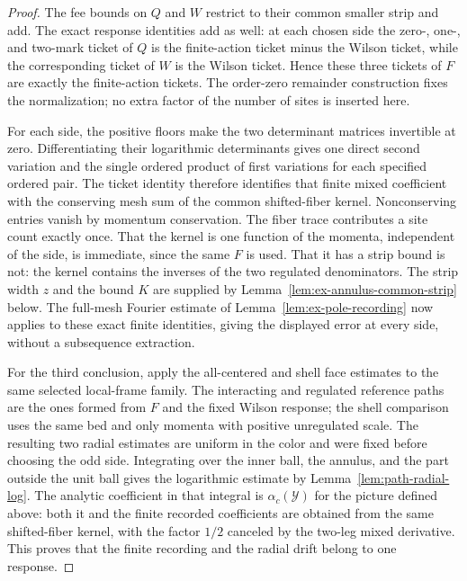 \begin{proof}
The fee bounds on $Q$ and $W$ restrict to their common smaller strip and add.
The exact response identities add as well: at each chosen side the zero-,
one-, and two-mark ticket of $Q$ is the finite-action ticket minus the
Wilson ticket, while the corresponding ticket of $W$ is the Wilson ticket.
Hence these three tickets of $F$ are exactly the finite-action tickets.
The order-zero remainder construction fixes the normalization; no extra
factor of the number of sites is inserted here.

For each side, the positive floors make the two determinant matrices
invertible at zero. Differentiating their logarithmic determinants gives
one direct second variation and the single ordered product of first
variations for each specified ordered pair. The ticket identity therefore
identifies that finite mixed coefficient with the conserving mesh sum of
the common shifted-fiber kernel. Nonconserving entries vanish by momentum
conservation. The fiber trace contributes a site count exactly once.
That the kernel is one function of the momenta, independent of the
side, is immediate, since the same $F$ is used. That it has a strip
bound is not: the kernel contains the inverses of the two regulated
denominators. The strip width $z$ and the bound $K$ are supplied by
Lemma~\ref{lem:ex-annulus-common-strip} below.
The full-mesh Fourier estimate of Lemma~\ref{lem:ex-pole-recording} now
applies to these exact finite identities, giving the displayed error at
every side, without a subsequence extraction.

For the third conclusion, apply the all-centered and shell face estimates
to the same selected local-frame family. The interacting and regulated
reference paths are the ones formed from $F$ and the fixed Wilson response;
the shell comparison uses the same bed and only momenta with positive
unregulated scale. The resulting two radial estimates are uniform in the
color and were fixed before choosing the odd side. Integrating over the
inner ball, the annulus, and the part outside the unit ball gives the
logarithmic estimate by Lemma~\ref{lem:path-radial-log}. The analytic
coefficient in that integral is $\alpha_c(\mathcal Y)$ for the picture
defined above: both it and the finite recorded coefficients are obtained
from the same shifted-fiber kernel, with the factor $1/2$ canceled by the
two-leg mixed derivative. This proves that the finite recording and the
radial drift belong to one response.
\end{proof}

